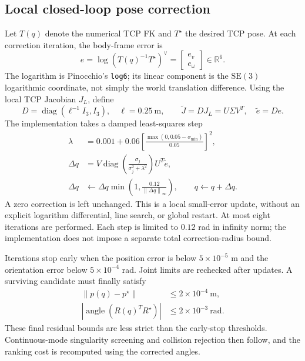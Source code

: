 \documentclass[11pt,a4paper]{report}
\newcommand{\file}[1]{\nolinkurl{#1}}
\newcommand{\R}{\mathbb{R}}
\newcommand{\diag}{\operatorname{diag}}
\newcommand{\norm}[1]{\left\lVert#1\right\rVert}
\begin{document}
\subsection{Local closed-loop pose correction}
Let $T(q)$ denote the numerical TCP FK and $T^\star$ the desired TCP pose.
At each correction iteration, the body-frame error is
\begin{equation}
 e=\log\!\left(T(q)^{-1}T^\star\right)^\vee
   =\begin{bmatrix}e_v\\e_\omega\end{bmatrix}\in\R^6.
\end{equation}
The logarithm is Pinocchio's \file{log6}; its linear component is the
$\mathrm{SE}(3)$ logarithmic coordinate, not simply the world translation
difference. Using the local TCP Jacobian $J_L$, define
\begin{equation}
 D=\diag(\ell^{-1}I_3,I_3),\quad \ell=0.25\ \mathrm{m},\qquad
 \widetilde J=DJ_L=U\Sigma V^T,\quad \widetilde e=De.
\end{equation}
The implementation takes a damped least-squares step
\begin{align}
 \lambda&=0.001+0.06
 \left[\frac{\max(0,0.05-\sigma_{\min})}{0.05}\right]^2,\\
 \Delta q&=V\diag\!\left(\frac{\sigma_j}{\sigma_j^2+\lambda^2}\right)U^T\widetilde e,\\
 \Delta q&\leftarrow\Delta q\min\left(1,\frac{0.12}{\norm{\Delta q}_\infty}\right),
 \qquad q\leftarrow q+\Delta q.
 \label{eq:dls}
\end{align}
A zero correction is left unchanged. This is a local small-error update,
without an explicit logarithm differential, line search, or global restart.
At most eight iterations are performed. Each step is limited to $0.12$ rad
in infinity norm; the implementation does not impose a separate total
correction-radius bound.

Iterations stop early when the position error is below $5\times10^{-5}$ m
and the orientation error below $5\times10^{-4}$ rad. Joint limits are
rechecked after updates. A surviving candidate must finally satisfy
\begin{align}
 \norm{p(q)-p^\star}&\le2\times10^{-4}\ \mathrm{m},\\
 \left|\operatorname{angle}\!\left(R(q)^TR^\star\right)\right|
 &\le2\times10^{-3}\ \mathrm{rad}.
 \label{eq:ikres}
\end{align}
These final residual bounds are less strict than the early-stop thresholds.
Continuous-mode singularity screening and collision rejection then follow,
and the ranking cost is recomputed using the corrected angles.
\end{document}
